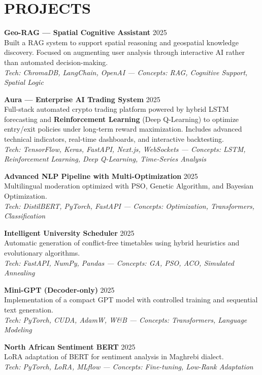 \documentclass[a4paper,12pt]{article}
\begin{document}
\section{PROJECTS}
\setlength{\parskip}{10pt}
{\small

\textbf{Geo-RAG — Spatial Cognitive Assistant} \hfill 2025 \\
Built a RAG system to support spatial reasoning and geospatial knowledge discovery. Focused on augmenting user analysis through interactive AI rather than automated decision-making. \\
\textit{Tech: ChromaDB, LangChain, OpenAI — Concepts: RAG, Cognitive Support, Spatial Logic}

\textbf{Aura — Enterprise AI Trading System} \hfill 2025 \\
Full-stack automated crypto trading platform powered by hybrid LSTM forecasting and \textbf{Reinforcement Learning} (Deep Q-Learning) to optimize entry/exit policies under long-term reward maximization. Includes advanced technical indicators, real-time dashboards, and interactive backtesting. \\
\textit{Tech: TensorFlow, Keras, FastAPI, Next.js, WebSockets — Concepts: LSTM, Reinforcement Learning, Deep Q-Learning, Time-Series Analysis}

\textbf{Advanced NLP Pipeline with Multi-Optimization} \hfill 2025 \\
Multilingual moderation optimized with PSO, Genetic Algorithm, and Bayesian Optimization. \\
\textit{Tech: DistilBERT, PyTorch, FastAPI — Concepts: Optimization, Transformers, Classification}

\textbf{Intelligent University Scheduler} \hfill 2025 \\
Automatic generation of conflict-free timetables using hybrid heuristics and evolutionary algorithms. \\
\textit{Tech: FastAPI, NumPy, Pandas — Concepts: GA, PSO, ACO, Simulated Annealing}

\textbf{Mini-GPT (Decoder-only)} \hfill 2025 \\
Implementation of a compact GPT model with controlled training and sequential text generation. \\
\textit{Tech: PyTorch, CUDA, AdamW, W\&B — Concepts: Transformers, Language Modeling}

\textbf{North African Sentiment BERT} \hfill 2025 \\
LoRA adaptation of BERT for sentiment analysis in Maghrebi dialect. \\
\textit{Tech: PyTorch, LoRA, MLflow — Concepts: Fine-tuning, Low-Rank Adaptation}

}
\end{document}
